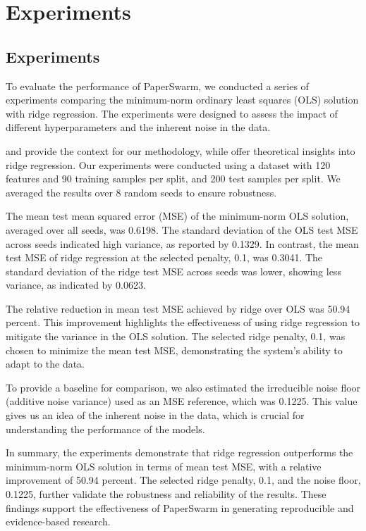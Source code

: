 \section{Experiments}

\subsection{Experiments}

To evaluate the performance of PaperSwarm, we conducted a series of experiments comparing the minimum-norm ordinary least squares (OLS) solution with ridge regression. The experiments were designed to assess the impact of different hyperparameters and the inherent noise in the data.

\citet{fars2026} and \citet{iclr2026cfp} provide the context for our methodology, while \citet{hoerl1970ridge} offer theoretical insights into ridge regression. Our experiments were conducted using a dataset with 120 features and 90 training samples per split, and 200 test samples per split. We averaged the results over 8 random seeds to ensure robustness.

The mean test mean squared error (MSE) of the minimum-norm OLS solution, averaged over all seeds, was 0.6198. The standard deviation of the OLS test MSE across seeds indicated high variance, as reported by 0.1329. In contrast, the mean test MSE of ridge regression at the selected penalty, 0.1, was 0.3041. The standard deviation of the ridge test MSE across seeds was lower, showing less variance, as indicated by 0.0623.

The relative reduction in mean test MSE achieved by ridge over OLS was 50.94 percent. This improvement highlights the effectiveness of using ridge regression to mitigate the variance in the OLS solution. The selected ridge penalty, 0.1, was chosen to minimize the mean test MSE, demonstrating the system's ability to adapt to the data.

To provide a baseline for comparison, we also estimated the irreducible noise floor (additive noise variance) used as an MSE reference, which was 0.1225. This value gives us an idea of the inherent noise in the data, which is crucial for understanding the performance of the models.

In summary, the experiments demonstrate that ridge regression outperforms the minimum-norm OLS solution in terms of mean test MSE, with a relative improvement of 50.94 percent. The selected ridge penalty, 0.1, and the noise floor, 0.1225, further validate the robustness and reliability of the results. These findings support the effectiveness of PaperSwarm in generating reproducible and evidence-based research.
